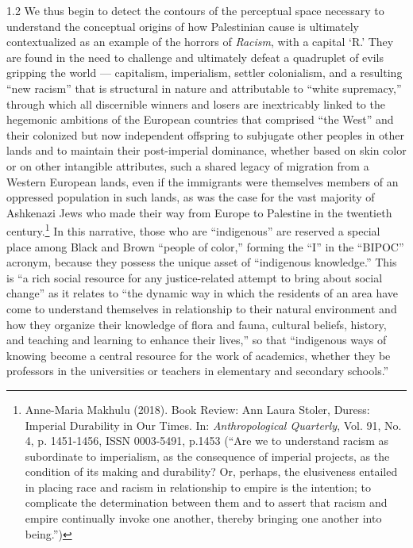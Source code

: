 \documentclass[../unravbook.tex]{subfiles}
\begin{document}
\begin{spacing}{1.2}
We thus begin to detect the contours of the perceptual space necessary to understand the conceptual origins of how Palestinian cause is ultimately contextualized as an example of the horrors of \textit{Racism}, with a capital `R.' They are found in the need to challenge and ultimately defeat a quadruplet of evils gripping the world --- capitalism, imperialism, settler colonialism, and a resulting ``new racism'' that is structural in nature and attributable to ``white supremacy,''  through which all discernible winners and losers are inextricably linked to the hegemonic ambitions of the European countries that comprised ``the West'' and their colonized but now independent offspring to subjugate other peoples in other lands and to maintain their post-imperial dominance, whether based on skin color or on other intangible attributes, such a shared legacy of migration from a Western European lands, even if the immigrants were themselves members of an oppressed population in such lands, as was the case for the vast majority of Ashkenazi Jews who made their way from Europe to Palestine in the twentieth century.\footnote{Anne-Maria Makhulu (2018). Book Review: Ann Laura Stoler, Duress: Imperial Durability in Our Times. In: \textit{Anthropological Quarterly}, Vol. 91, No. 4, p. 1451-1456, ISSN 0003-5491, p.1453 (``Are we to understand racism as subordinate to imperialism, as the consequence of imperial projects, as the condition of its making and durability? Or, perhaps, the elusiveness entailed in placing race and racism in relationship to empire is the intention; to complicate the determination between them and to assert that racism and empire continually invoke one another, thereby bringing one another into being.'')} In this narrative, those who are ``indigenous'' are reserved a special place among Black and Brown ``people of color,'' forming the ``I'' in the ``BIPOC'' acronym, because they possess the unique asset of ``indigenous knowledge.'' This is ``a rich social resource for any justice-related attempt to bring about social change'' as it relates to ``the dynamic way in which the residents of an area have come to understand themselves in relationship to their natural environment and how they organize their knowledge of flora and fauna, cultural beliefs, history, and teaching and learning to enhance their lives,'' so that ``indigenous ways of knowing become a central resource for the work of academics, whether they be professors in the universities or teachers in elementary and secondary schools.'' 


\end{spacing}
\end{document}
